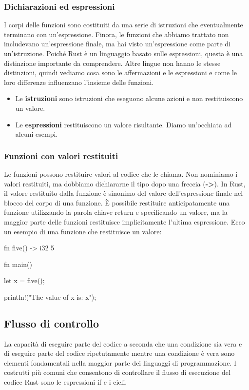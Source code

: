 \documentclass[11pt,a4paper]{article}
\begin{document}
\subsubsection{Dichiarazioni ed espressioni}

I corpi delle funzioni sono costituiti da una serie di istruzioni che eventualmente terminano con un'espressione. Finora, le funzioni che abbiamo trattato non includevano un'espressione finale, ma hai visto un'espressione come parte di un'istruzione. Poiché Rust è un linguaggio basato sulle espressioni, questa è una distinzione importante da comprendere. Altre lingue non hanno le stesse distinzioni, quindi vediamo cosa sono le affermazioni e le espressioni e come le loro differenze influenzano l'insieme delle funzioni.
\begin{itemize}
  \item Le \textbf{istruzioni} sono istruzioni che eseguono alcune azioni e non restituiscono un valore.
  \item Le \textbf{espressioni} restituiscono un valore risultante. Diamo un’occhiata ad alcuni esempi.
\end{itemize}

\subsubsection{Funzioni con valori restituiti}
Le funzioni possono restituire valori al codice che le chiama. Non nominiamo i valori restituiti, ma dobbiamo dichiararne il tipo dopo una freccia (\textbf{->}). In Rust, il valore restituito dalla funzione è sinonimo del valore dell'espressione finale nel blocco del corpo di una funzione. È possibile restituire anticipatamente una funzione utilizzando la parola chiave return e specificando un valore, ma la maggior parte delle funzioni restituisce implicitamente l'ultima espressione. Ecco un esempio di una funzione che restituisce un valore:

\begin{rust}
fn five() -> i32 {
    5
}

fn main() {
    let x = five();

    println!("The value of x is: {x}");
}
\end{rust}

\subsection{Flusso di controllo}

La capacità di eseguire parte del codice a seconda che una condizione sia vera e di eseguire parte del codice ripetutamente mentre una condizione è vera sono elementi fondamentali nella maggior parte dei linguaggi di programmazione. I costrutti più comuni che consentono di controllare il flusso di esecuzione del codice Rust sono le espressioni if e i cicli.\\
\end{document}
